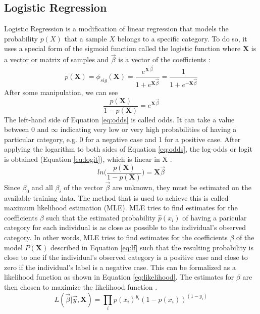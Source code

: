 \subsection{Logistic Regression}
Logistic Regression is a modification of linear regression that models the 
probability $p(X)$ that a sample $X$ belongs to a specific category. To do so, 
it uses a special form of the sigmoid function called the logistic function 
where $\mathbf{X}$ is a vector or matrix of samples and $\vec{\beta}$ is a 
vector of the coefficients \cite{RN170, RN166}:
\begin{equation}
 p(\mathbf{X}) = \phi_{sig}(\mathbf{X}) = 
\frac{e^{\mathbf{X}\vec{\beta}}}{1+e^{\mathbf{X}\vec{\beta}}} = 
\frac{1}{1+e^{-\mathbf{X}\vec{\beta}}}
 \label{eq:lf}
\end{equation}
After some manipulation, we can see
\begin{equation}
 \frac{p(\mathbf{X})}{1-p(\mathbf{X})} = e^{\mathbf{X}\vec{\beta}}
 \label{eq:odds}
\end{equation}
The left-hand side of Equation \ref{eq:odds} is called odds. It can take a 
value between 0 and $\infty$ indicating very low or very high probabilities 
of having a particular category, e.g. 0 for a negative case and 1 for a 
positive case.
After applying the logarithm to both sides of Equation \ref{eq:odds}, the 
log-odds or logit is obtained (Equation \ref{eq:logit}), which is linear in X 
\cite{RN174, RN166}.
\begin{equation}
 ln \Big( \frac{p(\mathbf{X})}{1-p(\mathbf{X})} \Big) = \mathbf{X}\vec{\beta}
 \label{eq:logit}
\end{equation}
Since $\beta_0$ and all $\beta_i$ of the vector $\vec{\beta}$ are unknown, 
they must be estimated on the 
available training data. The method that is used to achieve this is called 
maximum likelihood estimation (MLE). MLE tries to find estimates for the 
coefficients $\beta$ such that the estimated probability $\hat{p}(x_i)$ of 
having a paricular category for each individual is as close as possible to 
the individual's observed category. In other words, MLE tries to find estimates 
for the coefficients $\beta$ of the model $P(\mathbf{X})$ described in Equation 
\ref{eq:lf} such that the resulting probability is close to one if the 
individual's observed category is a positive case and close to zero if the 
individual's label is a negative case. This can be formalized as a likelihood 
function as shown in Equation \ref{eq:likelihood}. The estimates for $\beta$ 
are then chosen to maximize the likelihood function \cite{RN166}.
\begin{equation}
 L(\vec{\beta}|\vec{y}, \mathbf{X}) = \prod_{i} p(x_i)^{y_i} 
(1-p(x_i))^{(1-y_i)}
\label{eq:likelihood}
\end{equation}
